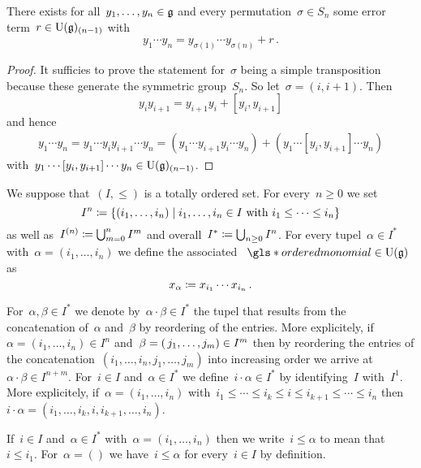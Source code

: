 \begin{lemma}
  \label{rearranging lemma}
  There exists for all~$y_1, \dotsc, y_n \in \mathfrak{g}$ and every permutation~$\sigma \in S_n$ some error term~$r \in \operatorname{U}(\mathfrak{g})_{(n-1)}$ with
  \[
    y_1 \dotsm y_n
    =
    y_{\sigma(1)} \dotsm y_{\sigma(n)}
    +
    r  \,.
  \]
\end{lemma}


\begin{proof}
  It sufficies to prove the statement for~$\sigma$ being a simple transposition because these generate the symmetric group~$S_n$.
  So let~$\sigma = (i, i+1)$.
  Then
  \[
    y_i y_{i+1}
    =
    y_{i+1} y_i + [y_i, y_{i+1}]
  \]
  and hence
  \begin{align*}
    y_1 \dotsm y_n
    =
    y_1 \dotsm y_i y_{i+1} \dotsm y_n
    =
    (y_1 \dotsm y_{i+1} y_i \dotsm y_n)
    +
    (y_1 \dotsm [y_i, y_{i+1}] \dotsm y_n)
  \end{align*}
  with~$y_1 \dotsm [y_i, y_{i+1}] \dotsm y_n \in \operatorname{U}(\mathfrak{g})_{(n-1)}$.
\end{proof}


\begin{convention}
  We suppose that~$(I, \leq)$ is a totally ordered set.
  For every~$n \geq 0$ we set
  \[
    I^n
    \defined
    \{
      (i_1, \dotsc, i_n)
    \suchthat
      \text{$i_1, \dotsc, i_n \in I$ with~$i_1 \leq \dotsb \leq i_n$}
    \}
  \]
  as well as~$I^{(n)} \coloneqq \bigcup_{m=0}^n I^m$ and overall~$I^* \coloneqq \bigcup_{n \geq 0} I^n$.
  For every tupel~$\alpha \in I^*$ with~$\alpha = (i_1, \dotsc, i_n)$ we define the associated ~$\gls*{ordered monomial} \in \Univ(\glie)$ as
  \[
    x_\alpha
    \coloneqq
    x_{i_1} \dotsm x_{i_n}  \,.
  \]
  
  For~$\alpha, \beta \in I^*$ we denote by~$\alpha \cdot \beta \in I^*$ the tupel that results from the concatenation of~$\alpha$ and~$\beta$ by reordering of the entries.
  More explicitely, if~$\alpha = (i_1, \dotsc, i_n) \in I^n$ and~$\beta = (\, j_1, \dotsc, j_m) \in I^m$ then by reordering the entries of the concatenation~$(i_1, \dotsc, i_n, j_1, \dotsc, j_m)$ into increasing order we arrive at~$\alpha \cdot \beta \in I^{n+m}$.
  For~$i \in I$ and~$\alpha \in I^*$ we define~$i \cdot \alpha \in I^*$ by identifying~$I$ with~$I^1$.
  More explicitely, if~$\alpha = (i_1, \dotsc, i_n)$ with~$i_1 \leq \dotsb \leq i_k \leq i \leq i_{k+1} \leq \dotsb \leq i_n$ then~$i \cdot \alpha = (i_1, \dotsc, i_k, i, i_{k+1}, \dotsc, i_n)$.
  
  If~$i \in I$ and~$\alpha \in I^*$ with~$\alpha = (i_1, \dotsc, i_n)$ then we write~$i \leq \alpha$ to mean that~$i \leq i_1$.
  For~$\alpha = ()$ we have~$i \leq \alpha$ for every~$i \in I$ by definition.
\end{convention}


